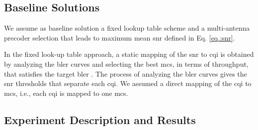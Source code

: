 \subsection{Baseline Solutions}

We assume as baseline solution a fixed lookup table scheme and a multi-antenna precoder selection that leads to maximum mean \gls{snr} defined in Eq. \eqref{eq.:snr}.

%
In the fixed look-up table approach, a static mapping of the \gls{snr} to \gls{cqi} is obtained by analyzing the \gls{bler} curves and selecting the best \gls{mcs}, in terms of throughput, that satisfies the target \gls{bler} \cite{bruno2014robust}.
%
The process of analyzing the \gls{bler} curves gives the \gls{snr} thresholds that separate each \gls{cqi}.
%
We assumed a direct mapping of the \gls{cqi} to \gls{mcs}, i.e., each \gls{cqi} is mapped to one \gls{mcs}.
%
%

\subsection{Experiment Description and Results}

